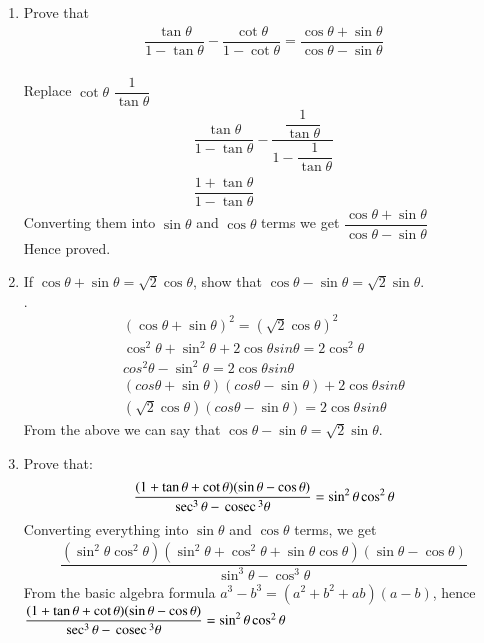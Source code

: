 \documentclass[journal,12pt,twocolumn]{IEEEtran}
\renewcommand\thesection{\arabic{section}}
\begin{document}
\begin{enumerate}[label=\thesection.\arabic*.,ref=\thesection.\theenumi]
\item Prove that 
\begin{align}
& \dfrac{\tan \theta}{1- \tan \theta} - \dfrac{\cot \theta}{ 1- \cot \theta} = \dfrac{\cos \theta + \sin \theta}{\cos \theta - \sin \theta} \nonumber&
\end{align}\\
\solution Replace $\cot \theta$  $\dfrac{1}{\tan \theta}$ \\
\begin{align}
& \dfrac{\tan \theta}{1- \tan \theta} - \dfrac{\dfrac{1}{\tan \theta}}{ 1- \dfrac{1}{\tan \theta}}  \nonumber& \\
& \dfrac{1+ \tan \theta}{1- \tan \theta}& \nonumber 
\end{align}
Converting them into $\sin \theta$ and $\cos \theta$ terms we get 
$ \dfrac{\cos \theta + \sin \theta}{\cos \theta - \sin \theta}$\\
Hence proved. \\
\item If $\cos \theta + \sin \theta = \sqrt{2} \cos \theta$, show that $\cos \theta - \sin \theta = \sqrt{2} \sin \theta$. \\
\solution. 
\begin{align}
& (\cos \theta + \sin \theta)^2 = (\sqrt{2} \cos \theta)^2& \nonumber \\
& \cos^2 \theta + \sin^2 \theta + 2\cos \theta sin \theta = 2\cos^2 \theta& \nonumber \\
& cos^2 \theta - \sin^2 \theta  = 2\cos \theta sin \theta& \nonumber \\
& (cos \theta + \sin \theta) (cos \theta - \sin \theta) + 2\cos \theta sin \theta& \nonumber \\
& (\sqrt{2} \cos \theta) (cos \theta - \sin \theta) = 2\cos \theta sin \theta& \nonumber 
\end{align}
From the above we can say that $\cos \theta - \sin \theta = \sqrt{2} \sin \theta$. 

\item Prove that:
\begin{align}
\dfrac{(1+ \tan \theta+ \cot \theta)(\sin \theta - \cos \theta)}{\sec^3 \theta - \,\text{cosec}\,^3 \theta} = \sin^2 \theta \cos^2 \theta \nonumber
\end{align}
Converting everything into $\sin \theta$ and $\cos \theta$ terms, we get \\
\begin{align}
\dfrac{(\sin^2 \theta \cos^2 \theta)(\sin^2 \theta + \cos^2 \theta+ \sin \theta \cos \theta)(\sin \theta - \cos \theta)}{\sin^3 \theta - \cos^3 \theta} \nonumber
\end{align}
From the basic algebra formula $a^3 - b^3 = (a^2+b^2+ab)(a-b)$, hence \\

$\dfrac{(1+ \tan \theta+ \cot \theta)(\sin \theta - \cos \theta)}{\sec^3 \theta - \,\text{cosec}\,^3 \theta} = \sin^2 \theta \cos^2 \theta$  \\

\end{enumerate}
\end{document}

